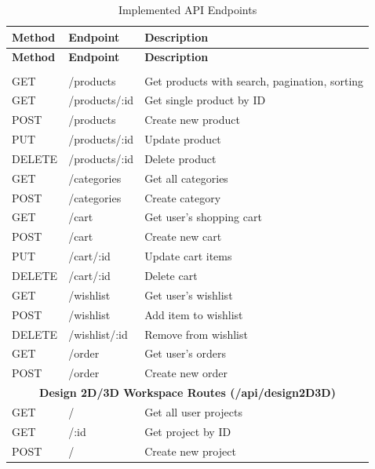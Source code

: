 \begin{longtable}{|p{2cm}|p{4cm}|p{6.5cm}|}
    \caption{Implemented API Endpoints} \label{tab:api_endpoints} \\
    \hline
    \textbf{Method} & \textbf{Endpoint} & \textbf{Description} \\
    \hline
    \endfirsthead
    \hline
    \textbf{Method} & \textbf{Endpoint} & \textbf{Description} \\
    \hline
    \endhead
    \hline
    \endfoot
    
    \multicolumn{3}{|c|}{\textbf{E-commerce Routes (/api/ecommerce)}} \\
    \hline
    GET & /products & Get products with search, pagination, sorting \\
    \hline
    GET & /products/:id & Get single product by ID \\
    \hline
    POST & /products & Create new product \\
    \hline
    PUT & /products/:id & Update product \\
    \hline
    DELETE & /products/:id & Delete product \\
    \hline
    GET & /categories & Get all categories \\
    \hline
    POST & /categories & Create category \\
    \hline
    GET & /cart & Get user's shopping cart \\
    \hline
    POST & /cart & Create new cart \\
    \hline
    PUT & /cart/:id & Update cart items \\
    \hline
    DELETE & /cart/:id & Delete cart \\
    \hline
    GET & /wishlist & Get user's wishlist \\
    \hline
    POST & /wishlist & Add item to wishlist \\
    \hline
    DELETE & /wishlist/:id & Remove from wishlist \\
    \hline
    GET & /order & Get user's orders \\
    \hline
    POST & /order & Create new order \\
    \hline
    \multicolumn{3}{|c|}{\textbf{Design 2D/3D Workspace Routes (/api/design2D3D)}} \\
    \hline
    GET & / & Get all user projects \\
    \hline
    GET & /:id & Get project by ID \\
    \hline
    POST & / & Create new project \\

\end{longtable}
